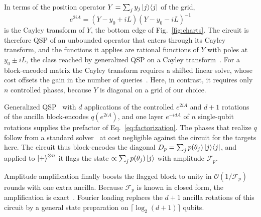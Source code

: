 In terms of the position operator
$Y=\sum_j y_j\ket{j}\!\bra{j}$ of the grid,
\begin{equation}
	e^{2iA}=(Y-y_0+iL)(Y-y_0-iL)^{-1}
	\label{eq:cayley}
\end{equation}
is the Cayley transform of $Y$, the bottom edge of
Fig.~\ref{fig:charts}.  The circuit is therefore QSP of an
unbounded operator that enters through its Cayley transform, and
the functions it applies are rational functions of $Y$ with poles
at $y_0\pm iL$, the class reached by generalized QSP on a Cayley
transform~\cite{DelCorso2026}.  For a block-encoded matrix the
Cayley transform requires a shifted linear solve, whose cost
offsets the gain in the number of
queries~\cite{DelCorso2026}.  Here, in contrast, it requires only
$n$ controlled phases, because $Y$ is diagonal on a grid of our
choice.

Generalized QSP~\cite{MotlaghWiebe2023} with $d$
applications of the controlled $e^{2iA}$ and $d+1$ rotations of the
ancilla block-encodes $q(e^{2iA})$, and one layer $e^{-idA}$ of $n$
single-qubit rotations supplies the prefactor of
Eq.~\eqref{eq:factorization}.  The phases that realize $q$ follow
from a standard
solver~\cite{MotlaghWiebe2023,DongMengWhaleyEtAl2021,BerntsonSunderhauf2024,NiSarkarYingLin2025}
at cost negligible against the circuit for the targets here.  The
circuit thus block-encodes the diagonal
$D_p=\sum_j p(\theta_j)\ket{j}\!\bra{j}$, and applied to
$\ket{+}^{\otimes n}$ it flags the state
$\propto\sum_j p(\theta_j)\ket{j}$ with amplitude $\mathcal{F}_p$.

Amplitude amplification finally boosts the flagged block to unity in
$\mathcal{O}(1/\mathcal{F}_p)$ rounds with one extra ancilla.
Because $\mathcal{F}_p$ is known in closed form, the amplification
is exact~\cite{BrassardHoyerMoscaTapp2002}.  Fourier loading
replaces the $d+1$ ancilla rotations of this circuit by a general
state preparation on $\lceil\log_2(d+1)\rceil$ qubits.

